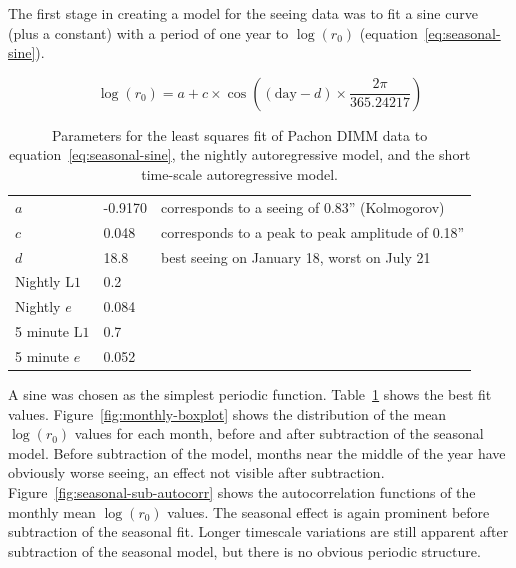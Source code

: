 \documentclass[\docopts]{\docclass}
\begin{document}
The first stage in creating a model for the seeing data was to fit a
sine curve (plus a constant) with a period of one year to
$\log(r_0)$ (equation~\ref{eq:seasonal-sine}).

\begin{equation} \label{eq:seasonal-sine}
\log(r_0) = a + c \times \cos\left( (\mbox{day} - d) \times \frac{2\pi}{365.24217} \right)
\end{equation}

\begin{table}
\begin{center}
\begin{tabular}{ l l l } \hline
  $a$ & -0.9170 & corresponds to a seeing of 0.83'' (Kolmogorov)\\
  $c$ & 0.048 & corresponds to a peak to peak amplitude of 0.18''\\
  $d$ & 18.8 & best seeing on January 18, worst on July 21 \\ \hline
  Nightly $\mbox{L1}$ & 0.2 \\
  Nightly $e$ & 0.084 \\ \hline
  5 minute $\mbox{L1}$ & 0.7 \\
  5 minute $e$ & 0.052 \\ \hline
\end{tabular}
\caption{Parameters for the least squares fit of Pachon DIMM data to
  equation~\ref{eq:seasonal-sine}, the nightly autoregressive model,
  and the short time-scale autoregressive model.}\label{tab:fit-params}
\end{center}
\end{table}

A sine was chosen as the simplest periodic
function. Table~\ref{tab:fit-params} shows the best fit
values. Figure~\ref{fig:monthly-boxplot} shows the distribution of the
mean $\log(r_0)$ values for each month, before and after subtraction
of the seasonal model. Before subtraction of the model, months near
the middle of the year have obviously worse seeing, an effect not
visible after subtraction. Figure~\ref{fig:seasonal-sub-autocorr}
shows the autocorrelation functions of the monthly mean $\log(r_0)$
values. The seasonal effect is again prominent before subtraction of
the seasonal fit. Longer timescale variations are still apparent after
subtraction of the seasonal model, but there is no obvious periodic
structure.
\end{document}
